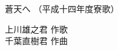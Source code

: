 \documentclass[10pt,b5j]{tarticle} %
\begin{document}
\begin{minipage}[c]{0.7\hsize} %
    \begin{center}
        {\LARGE
            蒼天へ %
        }
        {\small 
            （平成十四年度寮歌） %
        }
    \end{center}
\end{minipage}
\begin{minipage}[c]{0.3\hsize} %
    \begin{flushright} %
        上川雄之君 作歌\\千葉直樹君 作曲 %
    \end{flushright}
\end{minipage}
\end{document}
